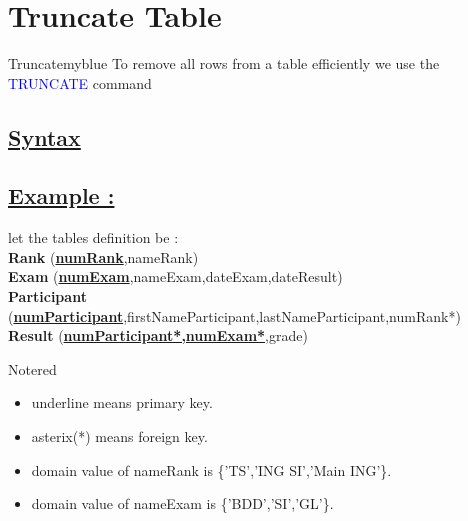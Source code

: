 

\vspace{0.35cm}
\section{Truncate Table}
\begin{prettyBox}{Truncate}{myblue}
    To remove all rows from a table efficiently we use the \textcolor{blue}{TRUNCATE} command
\end{prettyBox}

\vspace{0.15cm}
\subsection*{\underline{Syntax}}



\newpage

\subsection*{\underline{Example :}}
let the tables definition be :\\[0.2cm]
\textbf{Rank} (\underline{\textbf{numRank}},nameRank)\\[0.1cm]
\textbf{Exam} (\underline{\textbf{numExam}},nameExam,dateExam,dateResult)\\[0.1cm]
\textbf{Participant} (\underline{\textbf{numParticipant}},firstNameParticipant,lastNameParticipant,numRank*)\\[0.1cm]
\textbf{Result} (\underline{\textbf{numParticipant*,numExam*}},grade)

\vspace{0.35cm}

\begin{prettyBox}{Note}{red}
\begin{itemize}
    \item underline means primary key.
    \item asterix(*) means foreign key.
    \item domain value of nameRank is \{'TS','ING SI','Main ING'\}.
    \item domain value of nameExam is \{'BDD','SI','GL'\}.
\end{itemize}
\end{prettyBox}

